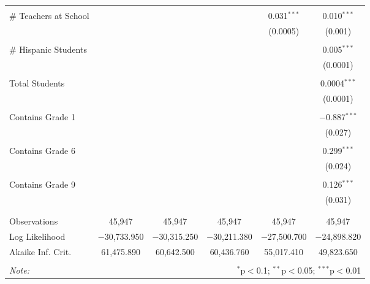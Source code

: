 \begin{table}[!htbp]
\begin{tabular}{@{\extracolsep{-2pt}}lccccc}
  & & & & & \\ 
 \# Teachers at School &  &  &  & 0.031$^{***}$ & 0.010$^{***}$ \\ 
  &  &  &  & (0.0005) & (0.001) \\ 
  & & & & & \\ 
 \# Hispanic Students &  &  &  &  & 0.005$^{***}$ \\ 
  &  &  &  &  & (0.0001) \\ 
  & & & & & \\ 
 Total Students &  &  &  &  & 0.0004$^{***}$ \\ 
  &  &  &  &  & (0.0001) \\ 
  & & & & & \\ 
 Contains Grade 1 &  &  &  &  & $-$0.887$^{***}$ \\ 
  &  &  &  &  & (0.027) \\ 
  & & & & & \\ 
 Contains Grade 6 &  &  &  &  & 0.299$^{***}$ \\ 
  &  &  &  &  & (0.024) \\ 
  & & & & & \\ 
 Contains Grade 9 &  &  &  &  & 0.126$^{***}$ \\ 
  &  &  &  &  & (0.031) \\ 
  & & & & & \\ 
\hline \\[-1.8ex] 
Observations & 45,947 & 45,947 & 45,947 & 45,947 & 45,947 \\ 
Log Likelihood & $-$30,733.950 & $-$30,315.250 & $-$30,211.380 & $-$27,500.700 & $-$24,898.820 \\ 
Akaike Inf. Crit. & 61,475.890 & 60,642.500 & 60,436.760 & 55,017.410 & 49,823.650 \\ 
\hline 
\hline \\[-1.8ex] 
\textit{Note:}  & \multicolumn{5}{r}{$^{*}$p$<$0.1; $^{**}$p$<$0.05; $^{***}$p$<$0.01} \\ 
\end{tabular} 
\end{table} 
